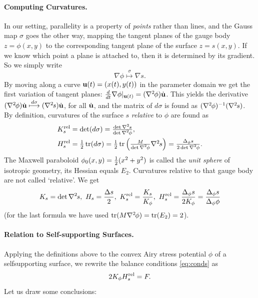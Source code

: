 \documentclass[annual]{acmsiggraph}
\def\tr{\mathop{\textrm{tr}}\nolimits}
\def\rel{{\mathord{\text{\rm rel}}}}
\def\ess{s}
\def\Hess#1{{\def\testess{#1}\nabla^2\ifx\testess\ess\!s\else #1\fi}}
\def\Hess#1{\text{$\nabla^2\hskip-.2ex #1$}}
\begin{document}
\paragraph{Computing Curvatures.}

In our setting, parallelity is a property of {\em points} rather than
lines, and the Gauss map $\sigma$ goes the other way, mapping the tangent
planes of the gauge body $z=\phi(x,y)$ to the corresponding tangent plane
of the surface $z=s(x,y)$. If we know which point a plane is attached to,
then it is determined by its gradient. So we simply write
	$$\nabla \phi\overset\sigma\longmapsto\nabla s.
	$$
 By moving along a curve ${\mathbf u}(t)=(x(t),y(t))$ in the parameter domain we
get the first variation of tangent planes:
	$
	{d\over dt}\nabla \phi|_{\uw(t)} =
	(\Hess\phi)\dot\uw
	$.
 This yields the derivative
	$	
	(\Hess\phi)\dot\uw \overset{d\sigma}\longmapsto
	(\Hess s)\dot\uw $,
 for all $\dot{{\mathbf u}}$, and the matrix of $d\sigma$ is found as
$(\Hess\phi)^{-1}(\Hess s)$.  By definition, curvatures of the surface $s$
{\em relative} to $\phi$ are found as
	\begin{align*}
		K_s^\rel
	& = \textstyle
		\det(d\sigma) =
		{\det\Hess s \over \det\Hess\phi} ,
	\\
		H_s^\rel
	&= \textstyle
		{1\over 2}\tr(d\sigma)
		= {1\over 2}\tr \left({M\over\det\Hess\phi} \Hess s\right)
		=  {\Delta_\phi s \over 2\det\Hess\phi}.
	\end{align*}
 The Maxwell paraboloid $\phi_0(x,y)={1\over 2}(x^2+y^2)$ is called the
{\em unit sphere} of isotropic geometry, its Hessian equals $E_2$.
Curvatures relative to that gauge body are not called `relative'. We get
	\begin{align*}
	K_s = \det \Hess s,
		\
	H_s = {\Delta s \over 2},
		\
	K_s^\rel = {K_s\over K_\phi},
		\
	H_s^\rel =  {\Delta_\phi s \over 2 K_\phi}
			= {\Delta_\phi s\over \Delta_\phi \phi}
	\end{align*}
 (for the last formula we have used $\tr (M\Hess\phi)=\tr(E_2)=2$).

\paragraph{Relation to Self-supporting Surfaces.}

Applying the definitions above to the convex Airy stress potential $\phi$
of a self\dash supporting surface, we rewrite the balance conditions
\eqref{eq:conds} as
	\begin{equation}
	2 K_\phi H_s^\rel  = F.
	\label{equigeo}
	\end{equation}
 Let us draw some conclusions:
\end{document}
